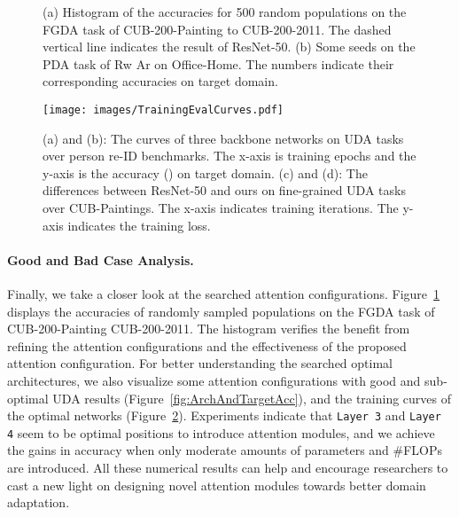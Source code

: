 \documentclass[10pt,twocolumn,letterpaper]{article}
\begin{document}
\begin{figure}\centering
    \vfill
    \caption{(a) Histogram of the accuracies for 500 random populations on the FGDA task of CUB-200-Painting to CUB-200-2011. The dashed vertical line indicates the result of ResNet-50.
    (b) Some seeds on the PDA task of Rw  Ar on Office-Home. The numbers indicate their corresponding accuracies on target domain.}
    \label{fig:HistOf500RandConfigs}
    \vspace{-4mm}
\end{figure} \begin{figure}
    \centering
    \texttt{[image: images/TrainingEvalCurves.pdf]}
    \caption{(a) and (b): The curves of three backbone networks on UDA tasks over person re-ID benchmarks. The x-axis is training epochs and the y-axis is the accuracy () on target domain.
    (c) and (d): The differences between ResNet-50 and ours on fine-grained UDA tasks over CUB-Paintings. The x-axis indicates training iterations. The y-axis indicates the training loss.}
    \label{fig:VisTrainingEvalCurves}
    \vspace{-4mm}
\end{figure} 
\vspace{-2mm}
\paragraph{Good and Bad Case Analysis.}
Finally, we take a closer look at the searched attention configurations. Figure~\ref{fig:HistOf500RandConfigs} displays the accuracies of  randomly sampled populations on the FGDA task of CUB-200-Painting  CUB-200-2011.
The histogram verifies the benefit from refining the attention configurations and the effectiveness of the proposed attention configuration.
For better understanding the searched optimal architectures, we also visualize some attention configurations with good and sub-optimal UDA results (Figure~\ref{fig:ArchAndTargetAcc}), and the training curves of the optimal networks (Figure~\ref{fig:VisTrainingEvalCurves}).
Experiments indicate that \texttt{Layer 3} and \texttt{Layer 4} seem to be optimal positions to introduce attention modules, and we achieve the gains in accuracy when only moderate amounts of parameters and \#FLOPs are introduced.
All these numerical results can help and encourage researchers to cast a new light on designing novel attention modules towards better domain adaptation.
\end{document}
